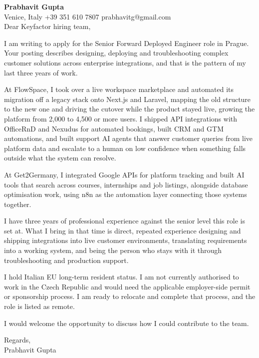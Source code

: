 \documentclass[a4paper,10.5pt]{article}
\begin{document}
\textbf{Prabhavit Gupta}\\
Venice, Italy \textbar{} +39 351 610 7807 \textbar{} prabhavitg@gmail.com\\[10pt]
Dear Keyfactor hiring team,

I am writing to apply for the Senior Forward Deployed Engineer role in Prague. Your posting describes designing, deploying and troubleshooting complex customer solutions across enterprise integrations, and that is the pattern of my last three years of work.

At FlowSpace, I took over a live workspace marketplace and automated its migration off a legacy stack onto Next.js and Laravel, mapping the old structure to the new one and driving the cutover while the product stayed live, growing the platform from 2,000 to 4,500 or more users. I shipped API integrations with OfficeRnD and Nexudus for automated bookings, built CRM and GTM automations, and built support AI agents that answer customer queries from live platform data and escalate to a human on low confidence when something falls outside what the system can resolve.

At Get2Germany, I integrated Google APIs for platform tracking and built AI tools that search across courses, internships and job listings, alongside database optimisation work, using n8n as the automation layer connecting those systems together.

I have three years of professional experience against the senior level this role is set at. What I bring in that time is direct, repeated experience designing and shipping integrations into live customer environments, translating requirements into a working system, and being the person who stays with it through troubleshooting and production support.

I hold Italian EU long-term resident status. I am not currently authorised to work in the Czech Republic and would need the applicable employer-side permit or sponsorship process. I am ready to relocate and complete that process, and the role is listed as remote.

I would welcome the opportunity to discuss how I could contribute to the team.

Regards,\\
Prabhavit Gupta
\end{document}
